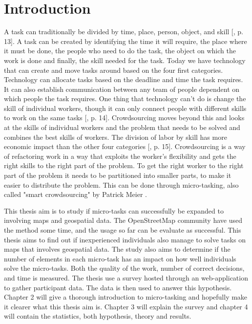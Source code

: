 \chapter{Introduction}
A task can traditionally be divided by time, place, person, object, and skill [\citep{Meier2013}, p. 13]. A task can be created by identifying the time it will require, the place where it must be done, the people who need to do the task, the object on which the work is done and finally, the skill needed for the task. Today we have technology that can create and move tasks around based on the four first categories.  Technology can allocate tasks based on the deadline and time the task requires. It can also establish communication between any team of people dependent on which people the task requires. One thing that technology can't do is change the skill of individual workers, though it can only connect people with different skills to work on the same tasks [\citep{Meier2013}, p. 14]. Crowdsourcing moves beyond this and looks at the skills of individual workers and the problem that needs to be solved and combines the best skills of workers. The division of labor by skill has more economic impact than the other four categories [\citep{Meier2013}, p. 15]. Crowdsourcing is a way of refactoring work in a way that exploits the worker's flexibility and gets the right skills to the right part of the problem. To get the right worker to the right part of the problem it needs to be partitioned into smaller parts, to make it easier to distribute the problem. This can be done through micro-tasking, also called "smart crowdsourcing" by Patrick Meier \citep{Meier2013a}. 

This thesis aim is to study if micro-tasks can successfully be expanded to involving maps and geospatial data. The OpenStreetMap community have used the method some time, and the usage so far can be evaluate as successful. %
This thesis aims to find out if inexperienced individuals also manage to solve tasks on maps that involves geospatial data. The study also aims to determine if the number of elements in each micro-task has an impact on how well individuals solve the micro-tasks. Both the quality of the work, number of correct decisions, and time is measured. The thesis use a survey hosted through an web-application to gather participant data. The data is then used to answer this hypothesis. Chapter 2 will give a thorough introduction to micro-tasking and hopefully make it clearer what this thesis aim is. Chapter 3 will explain the survey and chapter 4 will contain the statistics, both hypothesis, theory and results. 
